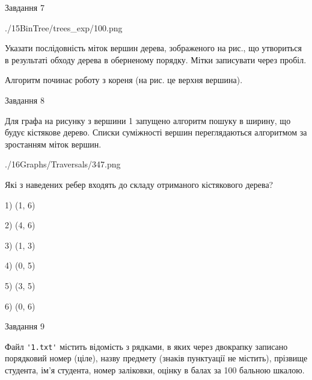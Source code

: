 \documentclass[12pt, ukrainian]{article}
\def\code#1{\Verb!#1!}
\begin{document}
{\vspace{10mm}\par

\newpage
\begin{minipage}[t]{9.7cm}
               
{\begin{center}Завдання {7}\end{center}}
\vspace{-6mm}

\begin{center}
	{./15BinTree/trees_exp/100.png}
\end{center}
Указати послідовність міток вершин дерева, зображеного на рис., що утвориться в результаті обходу дерева в оберненому порядку. Мітки записувати через пробіл.\par Алгоритм починає роботу з кореня (на рис. це верхня вершина).\par

\end{minipage}
\vline \hspace{8mm}
\begin{minipage}[t]{8.0cm}
               
{\begin{center}Завдання {8}\end{center}}
\vspace{-6mm}
Для графа на рисунку з вершини 1 запущено алгоритм пошуку в ширину, що будує кістякове дерево. Списки суміжності вершин переглядаються алгоритмом за зростанням міток вершин.\par
\begin{center}
	{./16Graphs/Traversals/347.png}
\end{center}
\par Які з наведених ребер входять до складу отриманого кістякового дерева?\par
1) (1, 6)\par
2) (4, 6)\par
3) (1, 3)\par
4) (0, 5)\par
5) (3, 5)\par
6) (0, 6)\par
{\vskip 15pt} \par

\end{minipage}

               
{\begin{center}Завдання {9}\end{center}}
\vspace{-6mm}
Файл \code{'1.txt'} містить відомість з рядками, в яких через двокрапку записа\-но поряд\-ковий номер (ціле), назву предмету (знаків пунктуації не містить), прізвище студента, ім'я студента, номер заліковки, оцінку в балах за 100 бальною шкалою.

}
\end{document}
